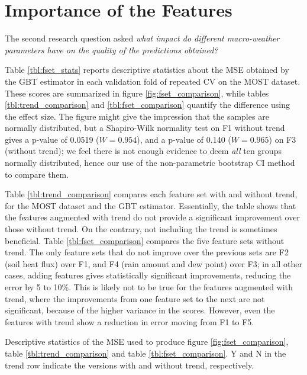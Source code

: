 \documentclass[a4paper,11pt]{kth-mag}
\begin{document}
\section{Importance of the Features}
\label{sec:feat_imps}
The second research question asked \emph{what impact do different macro-weather parameters have on the quality of the predictions obtained?}

Table \ref{tbl:fset_stats} reports descriptive statistics about the MSE obtained by the GBT estimator in each validation fold of repeated CV on the MOST dataset. These scores are summarized in figure \ref{fig:fset_comparison}, while tables \ref{tbl:trend_comparison} and \ref{tbl:fset_comparison} quantify the difference using the effect size. The figure might give the impression that the samples are normally distributed, but a Shapiro-Wilk normality test on F1 without trend gives a p-value of 0.0519 ($W=0.954$), and a p-value of 0.140 ($W=0.965$) on F3 (without trend); we feel there is not enough evidence to deem \emph{all} ten groups normally distributed, hence our use of the non-parametric bootstrap CI method to compare them.

Table \ref{tbl:trend_comparison} compares each feature set with and without trend, for the MOST dataset and the GBT estimator. Essentially, the table shows that the features augmented with trend do not provide a significant improvement over those without trend. On the contrary, not including the trend is sometimes beneficial. Table \ref{tbl:fset_comparison} compares the five feature sets without trend. The only feature sets that do not improve over the previous sets are F2 (soil heat flux) over F1, and F4 (rain amount and dew point) over F3; in all other cases, adding features gives statistically significant improvements, reducing the error by 5 to 10\%. This is likely not to be true for the features augmented with trend, where the improvements from one feature set to the next are not significant, because of the higher variance in the scores. However, even the features with trend show a reduction in error moving from F1 to F5.


\begin{table}
\caption{Descriptive statistics of the MSE used to produce figure \ref{fig:fset_comparison}, table \ref{tbl:trend_comparison} and table \ref{tbl:fset_comparison}. Y and N in the trend row indicate the versions with and without trend, respectively.}
\label{tbl:fset_stats}

\end{table}
\end{document}
